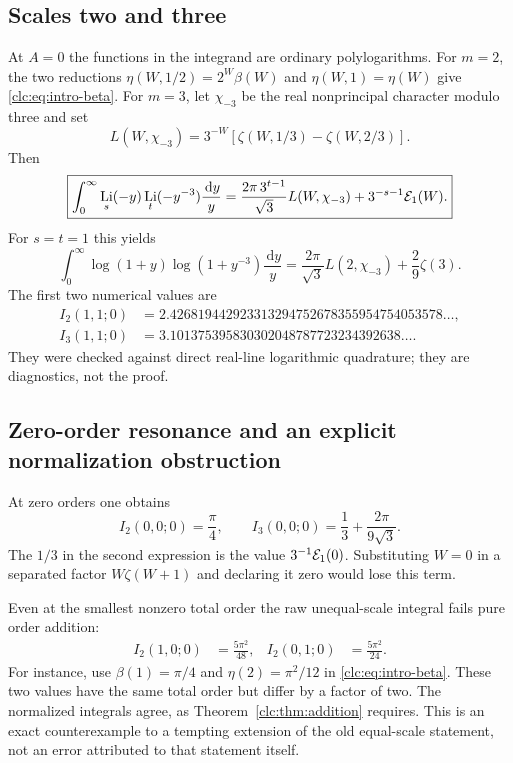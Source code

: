 \documentclass[11pt,a4paper]{article}
\numberwithin{equation}{section}
\theoremstyle{definition}\newtheorem{definition}[theorem]{Definition}
\theoremstyle{remark}\newtheorem{remark}[theorem]{Remark}
\DeclareMathOperator{\Li}{Li}
\newcommand{\dd}{\,\mathrm d}
\begin{document}
\subsection{Scales two and three}
At $A=0$ the functions in the integrand are ordinary polylogarithms.
For $m=2$, the two reductions
$\eta(W,1/2)=2^W\beta(W)$ and $\eta(W,1)=\eta(W)$ give
\eqref{clc:eq:intro-beta}. For $m=3$, let $\chi_{-3}$ be the real
nonprincipal character modulo three and set
\[
 L(W,\chi_{-3})=3^{-W}
       [\zeta(W,1/3)-\zeta(W,2/3)].
\]
Then
\begin{equation}\label{clc:eq:pair3}
 \boxed{\displaystyle
 \int_0^\infty\Li_s(-y)\Li_t(-y^{-3})\frac{\dd y}{y}
 =\frac{2\pi\,3^{t-1}}{\sqrt3}L(W,\chi_{-3})
    +3^{-s-1}\EE_1(W).}
\end{equation}
For $s=t=1$ this yields
\begin{equation}\label{clc:eq:log3}
 \int_0^\infty\log(1+y)\log(1+y^{-3})\frac{\dd y}{y}
 =\frac{2\pi}{\sqrt3}L(2,\chi_{-3})+\frac29\zeta(3).
\end{equation}
The first two numerical values are
\begin{align*}
 I_2(1,1;0)&=2.426819442923313294752678355954754053578\ldots,\\
 I_3(1,1;0)&=3.101375395830302048787723234392638\ldots.
\end{align*}
They were checked against direct real-line logarithmic quadrature;
they are diagnostics, not the proof.

\subsection{Zero-order resonance and an explicit normalization obstruction}
At zero orders one obtains
\begin{equation}\label{clc:eq:zero-examples}
 I_2(0,0;0)=\frac\pi4,\qquad
 I_3(0,0;0)=\frac13+\frac{2\pi}{9\sqrt3}.
\end{equation}
The $1/3$ in the second expression is the value
$3^{-1}\mathcal E_1(0)$. Substituting $W=0$ in a separated factor
$W\zeta(W+1)$ and declaring it zero would lose this term.

Even at the smallest nonzero total order the raw unequal-scale
integral fails pure order addition:
\begin{align}
 I_2(1,0;0)&=\frac{5\pi^2}{48},&
 I_2(0,1;0)&=\frac{5\pi^2}{24}.
 \label{clc:eq:swap}
\end{align}
For instance, use $\beta(1)=\pi/4$ and $\eta(2)=\pi^2/12$ in
\eqref{clc:eq:intro-beta}. These two values have the same total order
but differ by a factor of two. The normalized integrals agree, as
Theorem~\ref{clc:thm:addition} requires. This is an exact counterexample
to a tempting extension of the old equal-scale statement, not an error
attributed to that statement itself.
\end{document}
